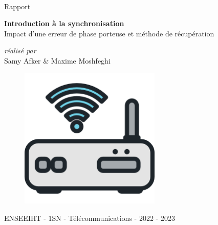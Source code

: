 \documentclass[11pt,a4paper]{report}
\begin{document}
 
\begin{titlepage}
\centering
\vspace{2.5cm}
\huge
\\ Rapport \\
\vspace{1cm}
\begin{center}
\textbf{Introduction à la synchronisation} \\ Impact d’une erreur de phase porteuse et méthode de récupération
\end{center}

\vspace{1cm}
\large \textit{réalisé par}\\
\vspace{0.2cm}
\Large Samy Afker \& Maxime Moshfeghi\\


\begin{figure}[ht]
    \centering
    \includegraphics[width=0.6\textwidth]{modem.png}
    \label{fig:Routeur}  
\end{figure}

\vspace{2cm}
ENSEEIHT - 1SN - Télécommunications -
\vspace{0.5cm}
2022 - 2023

\end{titlepage}
\end{document}
